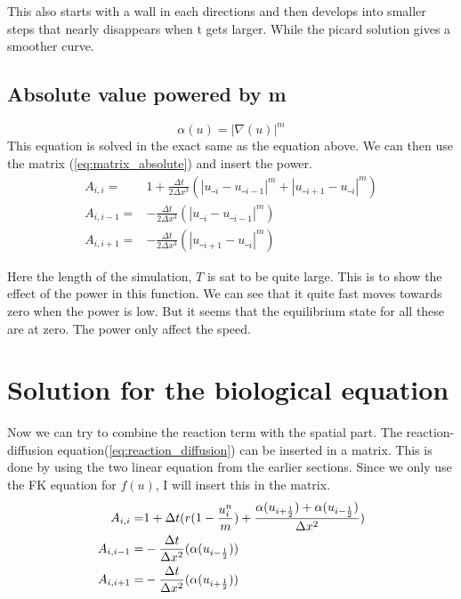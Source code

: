 \documentclass{book}
\begin{document}

This also starts with a wall in each directions and then develops into smaller steps that nearly disappears when t gets larger.
While the picard solution gives a smoother curve. 

\subsection{Absolute value powered by m}

\begin{equation}
	\alpha(u) = |\nabla(u)|^m
\end{equation}
This equation is solved in the exact same as the equation above. We can then use
the matrix (\ref{eq:matrix_absolute}) and insert the power.
\begin{align*} 
A_{i,i} =& 1+\frac{\Delta t}{2\Delta x^3}(\left|u\__i-u\__{i-1}\right|^m+ \left|u\__{i+1}-u\__i\right|^m)\\
A_{i,i-1} =&-\frac{\Delta t}{2\Delta x^3}(\left|u\__i-u\__{i-1}\right|^m)\\
A_{i,i+1} =&-\frac{\Delta t}{2\Delta x^3}(\left|u\__{i+1}-u\__i\right|^m)
\end{align*}


Here the length of the simulation, $T$ is sat to be quite large. This is to show the effect of the power in
this function. We can see that it quite fast moves towards zero when the power is low. But it seems that the equilibrium state for all these are at zero. The power only affect the speed.


\section{Solution for the biological equation}

Now we can try to combine the reaction term with the spatial part. The reaction-diffusion equation(\ref{eq:reaction_diffusion}) can be inserted in a matrix. This is done by using the two linear equation from the earlier sections.
Since we only use the FK equation for $f(u)$, I will insert this in the matrix.
\begin{align} \label{eq:matrix_reaction_diffusion}
A_{i,i} =& 1+\Delta t(r(1-\frac{u^n_i}{m})+\frac{\alpha(u_{i+\frac{1}{2}})+\alpha(u_{i-\frac{1}{2}})}{\Delta x^2})\notag\\
A_{i,i-1} =&-\frac{\Delta t}{\Delta x^2}(\alpha(u_{i-\frac{1}{2}}))\notag\\
A_{i,i+1} =&-\frac{\Delta t}{\Delta x^2}(\alpha(u_{i+\frac{1}{2}}))
\end{align}                               
\end{document}
